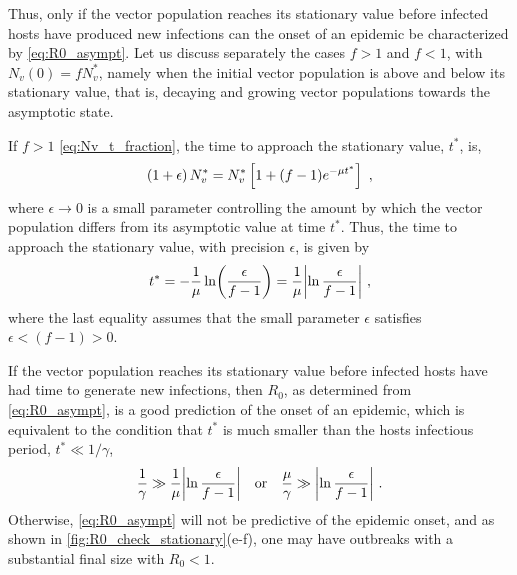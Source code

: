 Thus, only if the vector population reaches its stationary value before
infected hosts have produced new infections can the onset of an epidemic be
characterized by \cref{eq:R0_asympt}. Let us discuss separately the cases $f>1$
and $f<1$, with $N_v(0)=fN_v^*$, namely when the initial vector population is
above and below its stationary value, that is, decaying and growing vector
populations towards the asymptotic state.

If $f>1$ \cref{eq:Nv_t_fraction}, the time to approach the stationary
value, $t^*$, is,
\begin{equation}
    \left(1+\epsilon\right)N_v^*=N_v^*\left[1+(f-1)e^{-\mu t^*}\right] \ ,
\end{equation}
where $\epsilon\to 0$ is a small parameter controlling the amount by which
the vector population differs from its asymptotic value at time $t^*$. Thus,
the time to approach the stationary value, with precision $\epsilon$, is given
by
\begin{equation}
    t^*=-\frac{1}{\mu}\ln(\frac{\epsilon}{f-1})=
    \frac{1}{\mu}\abs{\ln{\frac{\epsilon}{f-1}}}
    \ ,
\end{equation}
where the last equality assumes that the small parameter $\epsilon$
satisfies $\epsilon<(f-1)>0$.

If the vector population reaches its stationary value before infected hosts
have had time to generate new infections, then $R_0$, as determined from
\cref{eq:R0_asympt}, is a good prediction of the onset of an epidemic, which
is equivalent to the condition that $t^*$ is much smaller than the hosts
infectious period, $t^*\ll1/\gamma$,
\begin{equation}\label{eq:timescales_condition}
    \frac{1}{\gamma} \gg \frac{1}{\mu}\abs{\ln{\frac{\epsilon}{f-1}}} \quad
    \textrm{or} \quad \frac{\mu}{\gamma}\gg\abs{\ln{\frac{\epsilon}{f-1}}}
    \ .
\end{equation}
Otherwise, \cref{eq:R0_asympt} will not be predictive of the epidemic
onset, and as shown in \cref{fig:R0_check_stationary}(e-f), one may have
outbreaks with a substantial final size with $R_0<1$.\\

